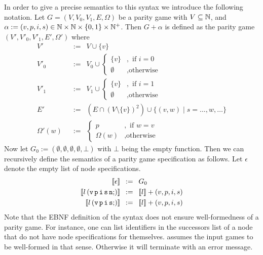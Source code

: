 In order to give a precise semantics to this syntax we introduce the following notation. Let
$G = (V,V_0,V_1,E,\Omega)$ be a parity game with $V \subseteq \mathbb{N}$, and
$\alpha := (v,p,i,s) \in \mathbb{N} \times \mathbb{N} \times \{0,1\} \times \mathbb{N}^+$. Then $G + \alpha$
is defined as the parity game $(V',V'_0,V'_1,E',\Omega')$ where
\begin{align*}
V' \enspace &:= \enspace V \cup \{v\} \\
V'_0 \enspace &:= \enspace V_0 \cup \begin{cases} \{v\} &, \mbox{ if } i=0 \\
     \emptyset &, \mbox{otherwise} \end{cases} \\
V'_1 \enspace &:= \enspace V_1 \cup \begin{cases} \{v\} &, \mbox{ if } i=1 \\
     \emptyset &, \mbox{otherwise} \end{cases} \\
E' \enspace &:= \enspace (E \cap (V \setminus \{v\})^2) \cup \{ (v,w) \mid s = \ldots,w,\ldots \} \\
\Omega'(w) \enspace &:= \enspace \begin{cases} p &, \mbox{ if } w=v \\
     \Omega(w) &, \mbox{otherwise} \end{cases}
\end{align*}
Now let $G_0 := (\emptyset,\emptyset,\emptyset,\emptyset,\bot)$ with $\bot$ being the empty
function. Then we can recursively define the semantics of a parity game specification as follows.
Let $\epsilon$ denote the empty list of node specifications.
\begin{align*}
\sem{\epsilon} \enspace &:= \enspace G_0 \\
\sem{l\, (\mathtt{v\, p\, i\, s\, n;})} \enspace &:= \enspace \sem{l} + (v,p,i,s) \\
\sem{l\, (\mathtt{v\, p\, i\, s;})} \enspace &:= \enspace \sem{l} + (v,p,i,s) \\
\end{align*}
Note that the EBNF definition of the syntax does not ensure well-formedness of a parity game.
For instance, one can list identifiers in the successors list of a node that do not have node
specifications for themselves. \pgsolver assumes the input games to be well-formed in that sense.
Otherwise it will terminate with an error message.

